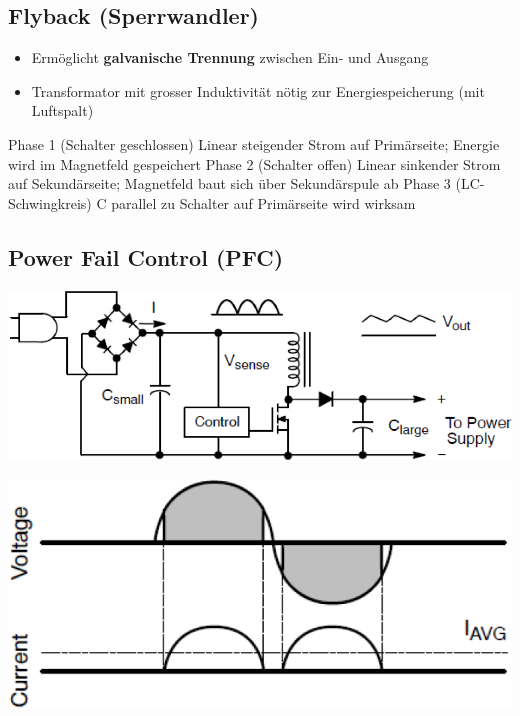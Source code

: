 \subsection{Flyback (Sperrwandler)}

\begin{minipage}[c]{0.4\columnwidth}
    
\end{minipage}
\hfill
\begin{minipage}[c]{0.58\columnwidth}
    \begin{itemize}
        \item Ermöglicht \textbf{galvanische Trennung} zwischen Ein- und Ausgang
        \item Transformator mit grosser Induktivität nötig zur Energiespeicherung (mit Luftspalt)
    \end{itemize}
\end{minipage}


\begin{outline}
    \1 Phase 1 (Schalter geschlossen)
        \2 Linear steigender Strom auf Primärseite; Energie wird im Magnetfeld gespeichert
    \1 Phase 2 (Schalter offen)
        \2 Linear sinkender Strom auf Sekundärseite; Magnetfeld baut sich über Sekundärspule ab
    \1 Phase 3 (LC-Schwingkreis)
        \2C parallel zu Schalter auf Primärseite wird wirksam 
\end{outline}


\subsection{Power Fail Control (PFC)}

\begin{minipage}[c]{0.42\columnwidth}
    \includegraphics[width=\columnwidth]{images/pfc_schaltung.png}
\end{minipage}
\hfill
\begin{minipage}[c]{0.42\columnwidth}
    \includegraphics[width=\columnwidth]{images/pfc.png}
\end{minipage}

